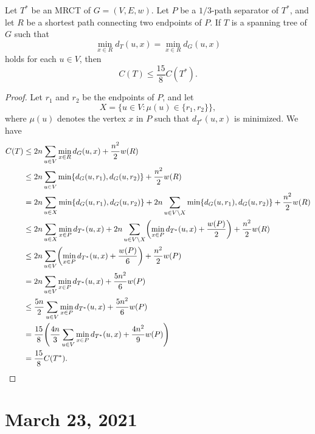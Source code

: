 \documentclass[11pt]{article}
\begin{document}
\begin{theorem}
  Let $T^*$ be an MRCT of $G = (V, E, w)$.
  Let $P$ be a $1/3$-path separator of $T^*$, and let $R$ be a shortest path connecting two endpoints of $P$.
  If $T$ is a spanning tree of $G$ such that
  \begin{equation*}
    \min_{x \in R} d_T(u, x) = \min_{x \in R} d_G(u, x)
  \end{equation*}
  holds for each $u \in V$, then
  \begin{equation*}
    C(T) \leq \frac{15}{8}C(T^*).
  \end{equation*}
\end{theorem}
\begin{proof}
  Let $r_1$ and $r_2$ be the endpoints of $P$, and let
  \begin{equation*}
    X = \{u \in V: \mu(u) \in \{r_1, r_2\}\},
  \end{equation*}
  where $\mu(u)$ denotes the vertex $x$ in $P$ such that $d_{T^*}(u, x)$ is minimized.
  We have
  \begin{align*}
    C(T)
    &\leq 2n \sum_{u \in V} \min_{x \in R} d_G(u, x) + \frac{n^2}{2} w(R) \\
    &\leq 2n \sum_{u \in V} \min \{d_G(u, r_1), d_G(u, r_2)\} + \frac{n^2}{2} w(R) \\
    &= 2n \sum_{u \in X} \min \{d_G(u, r_1), d_G(u, r_2)\} + 2n \sum_{u \in V \setminus X} \min \{d_G(u, r_1), d_G(u, r_2)\} + \frac{n^2}{2} w(R) \\
    &\leq 2n \sum_{u \in X} \min_{x \in P} d_{T^*}(u, x) + 2n \sum_{u \in V \setminus X} \biggl(\min_{x \in P} d_{T^*}(u, x) + \frac{w(P)}{2}\biggr) + \frac{n^2}{2} w(R) \\
    &\leq 2n \sum_{u \in V} \biggl(\min_{x \in P} d_{T^*}(u, x) + \frac{w(P)}{6}\biggr) + \frac{n^2}{2}w(P) \\
    &= 2n \sum_{u \in V} \min_{x \in P} d_{T^*}(u, x) + \frac{5n^2}{6}w(P) \\
    &\leq \frac{5n}{2} \sum_{u \in V} \min_{x \in P} d_{T^*}(u, x) + \frac{5n^2}{6}w(P) \\
    &= \frac{15}{8}\Biggl(\frac{4n}{3} \sum_{u \in V} \min_{x \in P} d_{T^*}(u, x) + \frac{4n^2}{9}w(P)\Biggr) \\
    &= \frac{15}{8}C(T^*).
    \qedhere
  \end{align*}
\end{proof}

\section{March 23, 2021}
\end{document}
